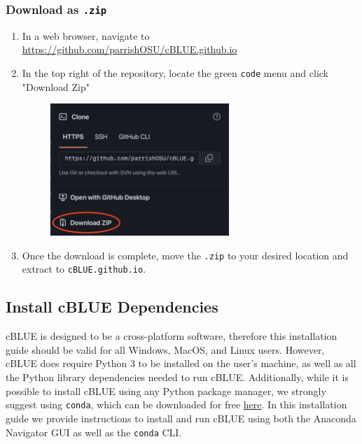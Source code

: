 \documentclass[11pt, a4paper]{article}
\begin{document}
\subsubsection{Download as \texttt{.zip}}
\begin{enumerate}
    \item In a web browser, navigate to \url{https://github.com/parrishOSU/cBLUE.github.io}
    \vspace{1em}
    \item In the top right of the repository, locate the green \texttt{code} menu and click "Download Zip"
    \begin{figure}[H]
        \centering
        \includegraphics[height=5cm]{figs/cblue_download_zip.png}
    \end{figure}
    \vspace{1em}
    \item Once the download is complete, move the \texttt{.zip} to your desired location and extract to \texttt{cBLUE.github.io}.
\end{enumerate}

\subsection{Install cBLUE Dependencies}
cBLUE is designed to be a cross-platform software, therefore this installation guide should be valid for all Windows, MacOS, and Linux users. However, cBLUE does require Python 3 to be installed on the user's machine, as well as all the Python library dependencies needed to run cBLUE. Additionally, while it is possible to install cBLUE using any Python package manager, we strongly suggest using \texttt{conda}, which can be downloaded for free  \href{https://www.anaconda.com/products/distribution}{here}. In this installation guide we provide instructions to install and run cBLUE using both the Anaconda Navigator GUI as well as the \texttt{conda} CLI.
\end{document}

